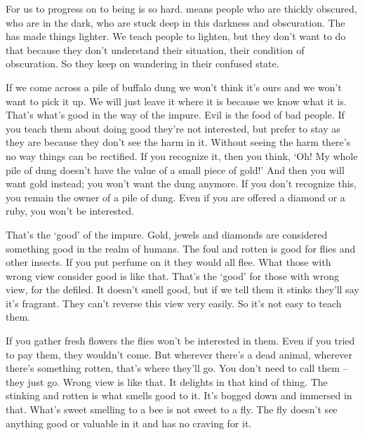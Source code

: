 For us  to progress on to being  is so hard.  means people who are thickly obscured, who are in the dark, who are stuck deep in this darkness and obscuration. The  has made things lighter. We teach people to lighten, but they don't want to do that because they don't understand their situation, their condition of obscuration. So they keep on wandering in their confused state.

If we come across a pile of buffalo dung we won't think it's ours and we won't want to pick it up. We will just leave it where it is because we know what it is. That's what's good in the way of the impure. Evil is the food of bad people. If you teach them about doing good they're not interested, but prefer to stay as they are because they don't see the harm in it. Without seeing the harm there's no way things can be rectified. If you recognize it, then you think, `Oh! My whole pile of dung doesn't have the value of a small piece of gold!' And then you will want gold instead; you won't want the dung anymore. If you don't recognize this, you remain the owner of a pile of dung. Even if you are offered a diamond or a ruby, you won't be interested.

That's the `good' of the impure. Gold, jewels and diamonds are considered something good in the realm of humans. The foul and rotten is good for flies and other insects. If you put perfume on it they would all flee. What those with wrong view consider good is like that. That's the `good' for those with wrong view, for the defiled. It doesn't smell good, but if we tell them it stinks they'll say it's fragrant. They can't reverse this view very easily. So it's not easy to teach them.

If you gather fresh flowers the flies won't be interested in them. Even if you tried to pay them, they wouldn't come. But wherever there's a dead animal, wherever there's something rotten, that's where they'll go. You don't need to call them -- they just go. Wrong view is like that. It delights in that kind of thing. The stinking and rotten is what smells good to it. It's bogged down and immersed in that. What's sweet smelling to a bee is not sweet to a fly. The fly doesn't see anything good or valuable in it and has no craving for it.

